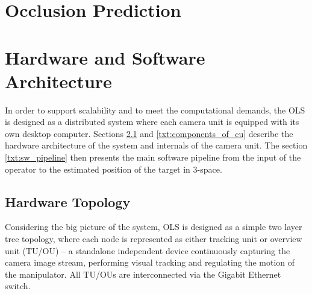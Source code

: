 \section{Occlusion Prediction} \label{txt:occlusion_prediction}

\section{Hardware and Software Architecture} \label{txt:hw_and_sw_architecture}

In order to support scalability and to meet the computational demands, the OLS is designed as a distributed system where each camera unit is equipped with its own desktop computer. Sections \ref{txt:hardware_topology} and \ref{txt:components_of_cu} describe the hardware architecture of the system and internals of the camera unit. The section \ref{txt:sw_pipeline} then presents the main software pipeline from the input of the operator to the estimated position of the target in 3-space.

\subsection{Hardware Topology} \label{txt:hardware_topology}

Considering the big picture of the system, OLS is designed as a simple two layer tree topology, where each node is represented as either tracking unit or overview unit (TU/OU) -- a standalone independent device continuously capturing the camera image stream, performing visual tracking and regulating the motion of the manipulator. All TU/OUs are interconnected via the Gigabit Ethernet switch. 

